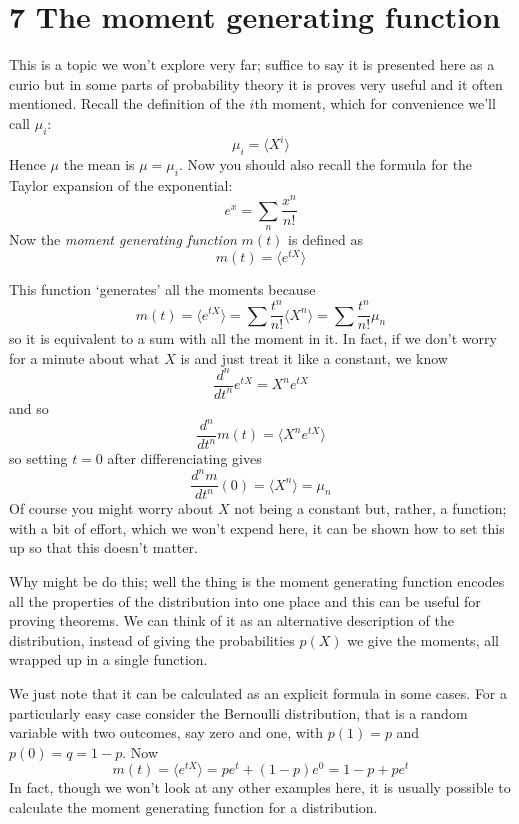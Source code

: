 \documentclass[11pt,a4paper]{scrartcl}
\begin{document}
\section*{7 The moment generating function}

This is a topic we won't explore very far; suffice to say it is
presented here as a curio but in some parts of probability theory it
is proves very useful and it often mentioned. Recall the definition of the $i$th moment, which for convenience we'll call $\mu_i$:
\begin{equation}
\mu_i=\langle X^i\rangle
\end{equation}
Hence $\mu$ the mean is $\mu=\mu_i$. Now you should also recall the
formula for the Taylor expansion of the exponential:
\begin{equation}
e^x=\sum_n \frac{x^n}{n!}
\end{equation}
Now the \textsl{moment generating function} $m(t)$ is defined as
\begin{equation}
m(t)=\langle e^{tX}\rangle
\end{equation}

This function \lq{}generates\rq{} all the moments because 
\begin{equation}
m(t)=\langle e^{tX}\rangle=\sum \frac{t^n}{n!}\langle X^n\rangle =\sum \frac{t^n}{n!}\mu_n
\end{equation}
so it is equivalent to a sum with all the moment in it. In fact, if we
don't worry for a minute about what $X$ is and just treat it like a
constant, we know
\begin{equation}
\frac{d^n}{dt^n}e^{tX}=X^ne^{tX}
\end{equation}
and so
\begin{equation}
\frac{d^n}{dt^n}m(t)=\langle X^ne^{tX}\rangle
\end{equation}
so setting $t=0$ after differenciating gives
\begin{equation}
\frac{d^nm}{dt^n}(0)=\langle X^n\rangle=\mu_n
\end{equation}
Of course you might worry about $X$ not being a constant but, rather,
a function; with a bit of effort, which we won't expend here, it can
be shown how to set this up so that this doesn't matter.

Why might be do this; well the thing is the moment generating function
encodes all the properties of the distribution into one place and this
can be useful for proving theorems. We can think of it as an
alternative description of the distribution, instead of giving the
probabilities $p(X)$ we give the moments, all wrapped up in a single
function.


We just note that it can be
calculated as an explicit formula in some cases. For a particularly
easy case consider the Bernoulli distribution, that is a random
variable with two outcomes, say zero and one, with $p(1)=p$ and $p(0)=q=1-p$. Now
\begin{equation}
m(t)=\langle e^{tX}\rangle=pe^t+(1-p)e^0=1-p+pe^t
\end{equation}
In fact, though we won't look at any other examples here, it is
usually possible to calculate the moment generating function for a
distribution.
\end{document}
